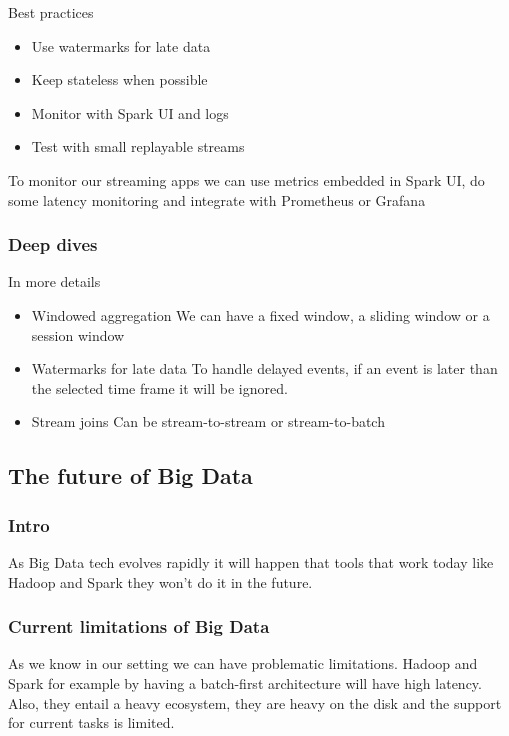 Best practices
\begin{itemize}
    \item Use watermarks for late data
    \item Keep stateless when possible
    \item Monitor with Spark UI and logs
    \item Test with small replayable streams
\end{itemize}

To monitor our streaming apps we can use metrics embedded in Spark UI, do some latency monitoring and integrate with Prometheus or Grafana

\subsubsection{Deep dives}

In more details

\begin{itemize}
    \item Windowed aggregation \ra We can have a fixed window, a sliding window or a session window
    \item Watermarks for late data \ra To handle delayed events, if an event is later than the selected time frame it will be ignored. 
    \item Stream joins \ra Can be stream-to-stream or stream-to-batch
\end{itemize}

\subsection{The future of Big Data}

\subsubsection{Intro}
As Big Data tech evolves rapidly it will happen that tools that work today like Hadoop and Spark they won't do it in the future. 

\subsubsection{Current limitations of Big Data}

As we know in our setting we can have problematic limitations. Hadoop and Spark for example by having a batch-first architecture will have high latency. Also, they entail a heavy ecosystem, they are heavy on the disk and the support for current tasks is limited. 

